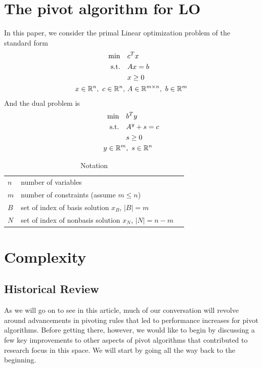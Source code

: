 \documentclass[11pt]{article}
\begin{document}
\section{The pivot algorithm for LO}
In this paper, we consider the primal Linear optimization problem of the standard form
\begin{align}
\begin{split}
\min \quad &c^Tx\\
\text{s.t.} \quad &Ax = b\\
&x \ge 0\\
 x \in \mathbb{R}^n,\ c \in \mathbb{R}^n,\ &A \in \mathbb{R}^{m\times n},\ b \in \mathbb{R}^m   
\end{split} \label{LOprimal}
\end{align}
And the dual problem is 
\begin{align}
\begin{split}
\min \quad &b^Ty\\
\text{s.t.} \quad &A^y + s = c\\
&s \ge 0\\
 y \in \mathbb{R}^m&,\ s \in \mathbb{R}^n   
\end{split} \label{LOdual}
\end{align}
\begin{table}[h]
\caption{Notation}
\centering
\begin{tabular}{lll}
\hline
$n$ & number of variables   &  \\
$m$ & number of constraints (assume $m \le n$) &  \\
$B$ & set of index of basis solution $x_B$, $|B| = m$&  \\
$N$ & set of index of nonbasis solution $x_N$, $|N| = n-m$&  \\
\hline
\end{tabular}
\end{table}

\section{Complexity}
\subsection{Historical Review}
As we will go on to see in this article, much of our conversation will revolve around advancements in pivoting rules that led to performance increases for pivot algorithms. Before getting there, however, we would like to begin by discussing a few key improvements to other aspects of pivot algorithms that contributed to research focus in this space. We will start by going all the way back to the beginning.
\end{document}
